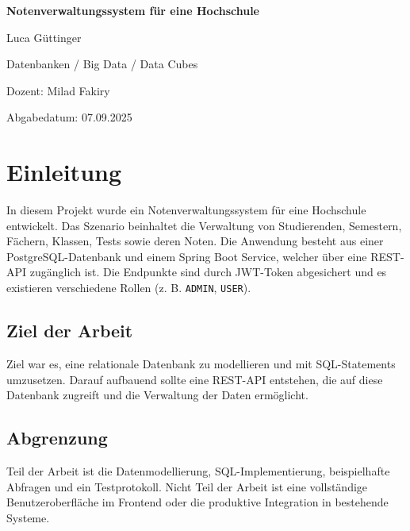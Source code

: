 \documentclass[12pt,a4paper]{article}
\begin{document}
    \begin{titlepage}
        \centering
        {\huge\bfseries Notenverwaltungssystem für eine Hochschule \par}
        \vspace{2cm}
        {\Large Luca Güttinger \par}
        \vspace{0.5cm}
        {\Large Datenbanken / Big Data / Data Cubes \par}
        \vspace{0.5cm}
        {\Large Dozent: Milad Fakiry \par}
        \vspace{0.5cm}
        {\Large Abgabedatum: 07.09.2025 \par}
        \vfill
    \end{titlepage}

    \tableofcontents
    \newpage

    \section{Einleitung}
    In diesem Projekt wurde ein Notenverwaltungssystem für eine Hochschule entwickelt.
    Das Szenario beinhaltet die Verwaltung von Studierenden, Semestern, Fächern, Klassen, Tests sowie deren Noten.
    Die Anwendung besteht aus einer PostgreSQL-Datenbank und einem Spring Boot Service, welcher über eine REST-API zugänglich ist.
    Die Endpunkte sind durch JWT-Token abgesichert und es existieren verschiedene Rollen (z. B. \texttt{ADMIN}, \texttt{USER}).

    \subsection{Ziel der Arbeit}
    Ziel war es, eine relationale Datenbank zu modellieren und mit SQL-Statements umzusetzen.
    Darauf aufbauend sollte eine REST-API entstehen, die auf diese Datenbank zugreift und die Verwaltung der Daten ermöglicht.

    \subsection{Abgrenzung}
    Teil der Arbeit ist die Datenmodellierung, SQL-Implementierung, beispielhafte Abfragen und ein Testprotokoll.
    Nicht Teil der Arbeit ist eine vollständige Benutzeroberfläche im Frontend oder die produktive Integration in bestehende Systeme.
\end{document}
